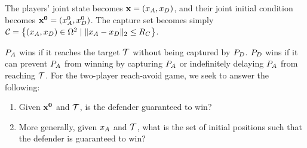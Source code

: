 The players' joint state becomes $\mathbf{x}=(x_A,x_D)$, and their joint initial condition becomes $\mathbf{x^0}=(x_A^0,x_D^0)$. The capture set becomes simply $\mathcal{C} = \left\{(x_A,x_D)\in\Omega^2 \mid \|x_A-x_D\|_2\leq R_C\right\}$. 

$P_A$ wins if it reaches the target $\mathcal{T}$ without being captured by $P_D$. $P_D$ wins if it can prevent $P_A$ from winning by capturing $P_A$ or indefinitely delaying $P_A$ from reaching $\mathcal{T}$. For the two-player reach-avoid game, we seek to answer the following:
\begin{enumerate}
\item Given $\mathbf{x^0}$ and $\mathcal{T}$, is the defender guaranteed to win? \label{p:tp1}
\item More generally, given $x_A$ and $\mathcal{T}$, what is the set of initial positions such that the defender is guaranteed to win? \label{p:tp2}
\end{enumerate}